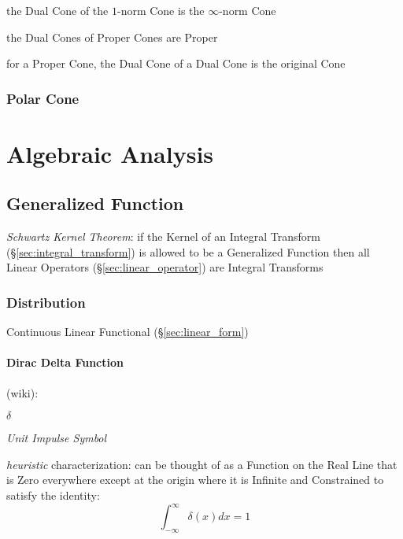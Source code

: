 the Dual Cone of the $1$-norm Cone is the $\infty$-norm Cone

the Dual Cones of Proper Cones are Proper

for a Proper Cone, the Dual Cone of a Dual Cone is the original Cone



\subsubsection{Polar Cone}\label{sec:polar_cone}



\section{Algebraic Analysis}\label{sec:algebraic_analysis}

\subsection{Generalized Function}\label{sec:generalized_function}

\emph{Schwartz Kernel Theorem}: if the Kernel of an Integral Transform
(\S\ref{sec:integral_transform}) is allowed to be a Generalized Function then
all Linear Operators (\S\ref{sec:linear_operator}) are Integral Transforms



\subsubsection{Distribution}\label{sec:distribution}

Continuous Linear Functional (\S\ref{sec:linear_form})



\paragraph{Dirac Delta Function}\label{sec:dirac_delta}\hfill

(wiki):

$\delta$

\emph{Unit Impulse Symbol}

\emph{heuristic} characterization: can be thought of as a Function on the Real
Line that is Zero everywhere except at the origin where it is Infinite and
Constrained to satisfy the identity:
\[
  \int_{-\infty}^\infty \delta(x) dx = 1
\]


